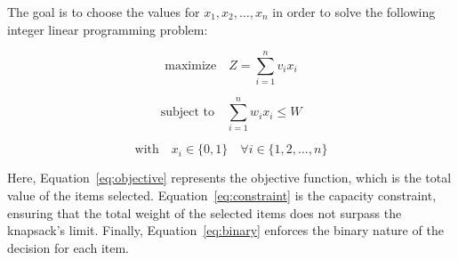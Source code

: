 The goal is to choose the values for \(x_1, x_2, \dots, x_n\) in order to solve the following integer linear programming problem:

\begin{equation}
\label{eq:objective}
\text{maximize} \quad Z = \sum_{i=1}^{n} v_i x_i
\end{equation}

\begin{equation}
\label{eq:constraint}
\text{subject to} \quad \sum_{i=1}^{n} w_i x_i \leq W
\end{equation}

\begin{equation}
\label{eq:binary}
\text{with} \quad x_i \in \{0, 1\} \quad \forall i \in \{1, 2, \dots, n\}
\end{equation}

Here, Equation~\ref{eq:objective} represents the objective function, which is the total value of the items selected. Equation~\ref{eq:constraint} is the capacity constraint, ensuring that the total weight of the selected items does not surpass the knapsack's limit. Finally, Equation~\ref{eq:binary} enforces the binary nature of the decision for each item.
